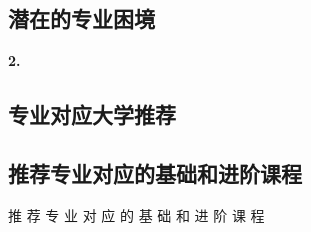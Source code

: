 \documentclass[12pt]{article}
\begin{document}
\begin{CJK*}{UTF8}{gbsn}
   \subsection*{潜在的专业困境}\textbf{2.} %


   \newpage
   \subsection*{专业对应大学推荐}


   \newpage
   \subsection*{推荐专业对应的基础和进阶课程}
   推 荐 专 业 对 应 的 基 础 和 进 阶 课 程
   

      

\end{CJK*}
\end{document}
